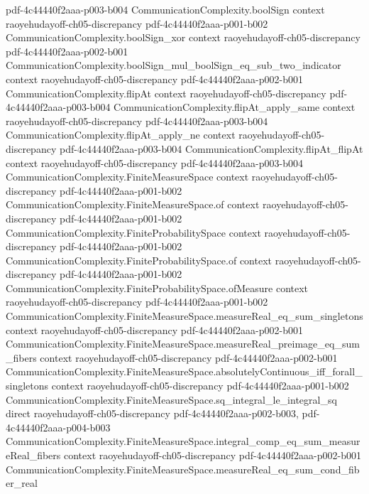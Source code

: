 \begin{lemma}
  {pdf-4c44440f2aaa-p003-b004}
\proofstep
  {CommunicationComplexity.boolSign}
  {context}
  {raoyehudayoff-ch05-discrepancy}
  {pdf-4c44440f2aaa-p001-b002}
\proofstep
  {CommunicationComplexity.boolSign_xor}
  {context}
  {raoyehudayoff-ch05-discrepancy}
  {pdf-4c44440f2aaa-p002-b001}
\proofstep
  {CommunicationComplexity.boolSign_mul_boolSign_eq_sub_two_indicator}
  {context}
  {raoyehudayoff-ch05-discrepancy}
  {pdf-4c44440f2aaa-p002-b001}
\proofstep
  {CommunicationComplexity.flipAt}
  {context}
  {raoyehudayoff-ch05-discrepancy}
  {pdf-4c44440f2aaa-p003-b004}
\proofstep
  {CommunicationComplexity.flipAt_apply_same}
  {context}
  {raoyehudayoff-ch05-discrepancy}
  {pdf-4c44440f2aaa-p003-b004}
\proofstep
  {CommunicationComplexity.flipAt_apply_ne}
  {context}
  {raoyehudayoff-ch05-discrepancy}
  {pdf-4c44440f2aaa-p003-b004}
\proofstep
  {CommunicationComplexity.flipAt_flipAt}
  {context}
  {raoyehudayoff-ch05-discrepancy}
  {pdf-4c44440f2aaa-p003-b004}
\proofstep
  {CommunicationComplexity.FiniteMeasureSpace}
  {context}
  {raoyehudayoff-ch05-discrepancy}
  {pdf-4c44440f2aaa-p001-b002}
\proofstep
  {CommunicationComplexity.FiniteMeasureSpace.of}
  {context}
  {raoyehudayoff-ch05-discrepancy}
  {pdf-4c44440f2aaa-p001-b002}
\proofstep
  {CommunicationComplexity.FiniteProbabilitySpace}
  {context}
  {raoyehudayoff-ch05-discrepancy}
  {pdf-4c44440f2aaa-p001-b002}
\proofstep
  {CommunicationComplexity.FiniteProbabilitySpace.of}
  {context}
  {raoyehudayoff-ch05-discrepancy}
  {pdf-4c44440f2aaa-p001-b002}
\proofstep
  {CommunicationComplexity.FiniteProbabilitySpace.ofMeasure}
  {context}
  {raoyehudayoff-ch05-discrepancy}
  {pdf-4c44440f2aaa-p001-b002}
\proofstep
  {CommunicationComplexity.FiniteMeasureSpace.measureReal_eq_sum_singletons}
  {context}
  {raoyehudayoff-ch05-discrepancy}
  {pdf-4c44440f2aaa-p002-b001}
\proofstep
  {CommunicationComplexity.FiniteMeasureSpace.measureReal_preimage_eq_sum_fibers}
  {context}
  {raoyehudayoff-ch05-discrepancy}
  {pdf-4c44440f2aaa-p002-b001}
\proofstep
  {CommunicationComplexity.FiniteMeasureSpace.absolutelyContinuous_iff_forall_singletons}
  {context}
  {raoyehudayoff-ch05-discrepancy}
  {pdf-4c44440f2aaa-p001-b002}
\proofstep
  {CommunicationComplexity.FiniteMeasureSpace.sq_integral_le_integral_sq}
  {direct}
  {raoyehudayoff-ch05-discrepancy}
  {pdf-4c44440f2aaa-p002-b003,
    pdf-4c44440f2aaa-p004-b003}
\proofstep
  {CommunicationComplexity.FiniteMeasureSpace.integral_comp_eq_sum_measureReal_fibers}
  {context}
  {raoyehudayoff-ch05-discrepancy}
  {pdf-4c44440f2aaa-p002-b001}
\proofstep
  {CommunicationComplexity.FiniteMeasureSpace.measureReal_eq_sum_cond_fiber_real}

\end{lemma}
